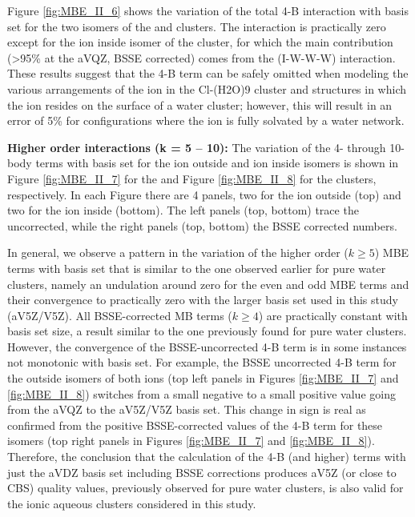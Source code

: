 \documentclass[11pt, proquest]{uwthesis}[2020/02/24]
\let\ce\ch
\newcommand{\textapprox}{\raisebox{0.5ex}{\texttildelow}}
\begin{document}


\par Figure \ref{fig:MBE_II_6} shows the variation of the total 4-B interaction with basis set for the two isomers of the \ce{Li^+(H2O)9} and \ce{Cl^-(H2O)9} clusters. The interaction is practically zero except for the ion inside isomer of the \ce{Li^+(H2O)9} cluster, for which the main contribution (\textgreater 95\% at the aVQZ, BSSE corrected) comes from the (I-W-W-W) interaction. These results suggest that the 4-B term can be safely omitted when modeling the various arrangements of the ion in the Cl-(H2O)9 cluster and structures in which the \ce{Li^+} ion resides on the surface of a water cluster; however, this will result in an error of \textapprox5\% for configurations where the \ce{Li^+} ion is fully solvated by a water network.


\textbf{Higher order interactions (k = 5 – 10):} The variation of the 4- through 10-body terms with basis set for the ion outside and ion inside isomers is shown in Figure \ref{fig:MBE_II_7} for the \ce{Li^+(H2O)9} and Figure \ref{fig:MBE_II_8} for the \ce{Cl^-(H2O)9} clusters, respectively. In each Figure there are 4 panels, two for the ion outside (top) and two for the ion inside (bottom). The left panels (top, bottom) trace the uncorrected, while the right panels (top, bottom) the BSSE corrected numbers.

\par In general, we observe a pattern in the variation of the higher order ($k \geq 5$) MBE terms with basis set that is similar to the one observed earlier for pure water clusters,\autocite{heindel_many-body_2020} namely an undulation around zero for the even and odd MBE terms and their convergence to practically zero with the larger basis set used in this study (aV5Z/V5Z). All BSSE-corrected MB terms ($k \geq 4$) are practically constant with basis set size, a result similar to the one previously found for pure water clusters.\autocite{heindel_many-body_2020} However, the convergence of the BSSE-uncorrected 4-B term is in some instances not monotonic with basis set. For example, the BSSE uncorrected 4-B term for the outside isomers of both ions (top left panels in Figures \ref{fig:MBE_II_7} and \ref{fig:MBE_II_8}) switches from a small negative to a small positive value going from the aVQZ to the aV5Z/V5Z basis set. This change in sign is real as confirmed from the positive BSSE-corrected values of the 4-B term for these isomers (top right panels in Figures \ref{fig:MBE_II_7} and \ref{fig:MBE_II_8}). Therefore, the conclusion that the calculation of the 4-B (and higher) terms with just the aVDZ basis set including BSSE corrections produces aV5Z (or close to CBS) quality values, previously observed for pure water clusters,\autocite{heindel_many-body_2020} is also valid for the ionic aqueous clusters considered in this study.

\end{document}
